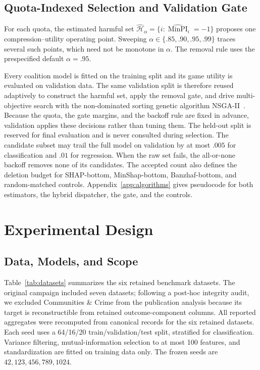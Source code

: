 \documentclass{article}
\begin{document}
\subsection{Quota-Indexed Selection and Validation Gate}
\label{sec:selection}

For each quota, the estimated harmful set $\widehat{\mathcal{H}}_\alpha=\{i:\widehat{\operatorname{MinPI}}_i=-1\}$ proposes one compression--utility operating point. Sweeping $\alpha\in\{.85,.90,.95,.99\}$ traces several such points, which need not be monotone in $\alpha$. The removal rule uses the prespecified default $\alpha=.95$.

Every coalition model is fitted on the training split and its game utility is evaluated on validation data. The same validation split is therefore reused adaptively to construct the harmful set, apply the removal gate, and drive multi-objective search with the non-dominated sorting genetic algorithm NSGA-II~\citep{deb2002fast}. Because the quota, the gate margins, and the backoff rule are fixed in advance, validation applies these decisions rather than tuning them. The held-out split is reserved for final evaluation and is never consulted during selection. The candidate subset may trail the full model on validation by at most $.005$ for classification and $.01$ for regression. When the raw set fails, the all-or-none backoff removes none of its candidates. The accepted count also defines the deletion budget for SHAP-bottom, MinShap-bottom, Banzhaf-bottom, and random-matched controls. Appendix~\ref{app:algorithms} gives pseudocode for both estimators, the hybrid dispatcher, the gate, and the controls.

\section{Experimental Design}
\label{sec:experiments}

\subsection{Data, Models, and Scope}

Table~\ref{tab:datasets} summarizes the six retained benchmark datasets. The original campaign included seven datasets; following a post-hoc integrity audit, we excluded Communities \& Crime from the publication analysis because its target is reconstructible from retained outcome-component columns. All reported aggregates were recomputed from canonical records for the six retained datasets. Each seed uses a 64/16/20 train/validation/test split, stratified for classification. Variance filtering, mutual-information selection to at most 100 features, and standardization are fitted on training data only. The frozen seeds are $42,123,456,789,1024$.
\end{document}

